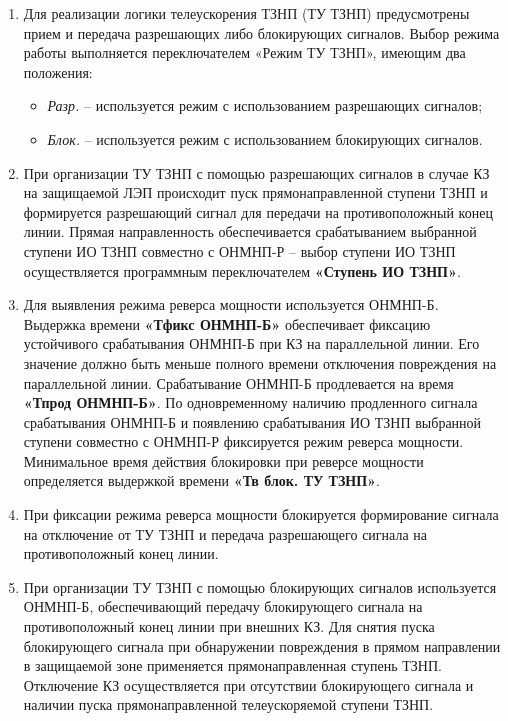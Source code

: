 \begin{enumerate}
\begin{enumerate}
\item
Для реализации логики телеускорения ТЗНП (ТУ ТЗНП) предусмотрены прием и передача разрешающих либо блокирующих сигналов. Выбор режима работы выполняется переключателем «Режим ТУ ТЗНП», имеющим два положения:
\begin{itemize}
    \item \textit{Разр.} -- используется режим с использованием разрешающих сигналов;
    \item \textit{Блок.} -- используется режим с использованием блокирующих сигналов.
\end{itemize}

\item
При организации ТУ ТЗНП с помощью разрешающих сигналов в случае КЗ на защищаемой ЛЭП происходит пуск прямонаправленной ступени ТЗНП и формируется разрешающий сигнал для передачи на противоположный конец линии. Прямая направленность обеспечивается срабатыванием выбранной ступени ИО ТЗНП совместно с ОНМНП-Р -- выбор ступени ИО ТЗНП осуществляется программным переключателем \textbf{«Ступень ИО ТЗНП»}. 

\item
Для выявления режима реверса мощности используется ОНМНП-Б. Выдержка времени \textbf{«Тфикс ОНМНП-Б»} обеспечивает фиксацию устойчивого срабатывания ОНМНП-Б при КЗ на параллельной линии. Его значение должно быть меньше полного времени отключения повреждения на параллельной линии. Срабатывание ОНМНП-Б продлевается на время \textbf{«Тпрод ОНМНП-Б»}. По одновременному наличию продленного сигнала срабатывания ОНМНП-Б и появлению срабатывания ИО ТЗНП выбранной ступени совместно с ОНМНП-Р фиксируется режим реверса мощности. Минимальное время действия блокировки при реверсе мощности определяется выдержкой времени \textbf{«Тв блок. ТУ ТЗНП»}. 

\item
При фиксации режима реверса мощности блокируется формирование сигнала на отключение от ТУ ТЗНП и передача разрешающего сигнала на противоположный конец линии.

\item
При организации ТУ ТЗНП с помощью блокирующих сигналов используется ОНМНП-Б, обеспечивающий передачу блокирующего сигнала на противоположный конец линии при внешних КЗ. Для снятия пуска блокирующего сигнала при обнаружении повреждения в прямом направлении в защищаемой зоне применяется прямонаправленная ступень ТЗНП. Отключение КЗ осуществляется при отсутствии блокирующего сигнала и наличии пуска прямонаправленной телеускоряемой ступени ТЗНП.


\end{enumerate}
\end{enumerate}
